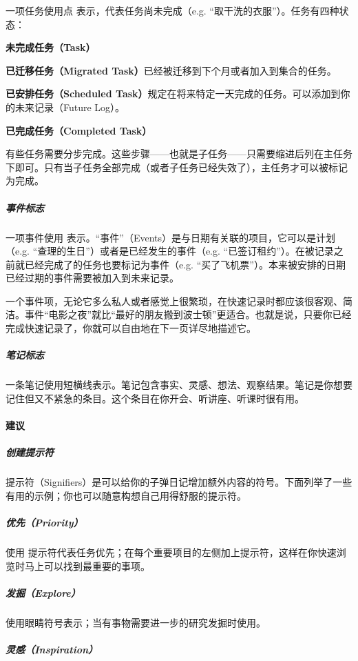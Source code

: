 \documentclass[a5paper]{article}
\begin{document}
一项任务使用点 \textbullet 表示，代表任务尚未完成（e.g. “取干洗的衣服”）。任务有四种状态：

\textbf{未完成任务（Task）}

\textbf{已迁移任务（Migrated Task）}已经被迁移到下个月或者加入到集合的任务。

\textbf{已安排任务（Scheduled Task）}规定在将来特定一天完成的任务。可以添加到你的未来记录（Future Log）。

\textbf{已完成任务（Completed Task）}

有些任务需要分步完成。这些步骤——也就是子任务——只需要缩进后列在主任务下即可。只有当子任务全部完成（或者子任务已经失效了），主任务才可以被标记为完成。

\clearpage

\subparagraph{事件标志}

一项事件使用 \textbigcircle 表示。“事件”（Events）是与日期有关联的项目，它可以是计划（e.g. “查理的生日”）或者是已经发生的事件（e.g. “已签订租约”）。在被记录之前就已经完成了的任务也要标记为事件（e.g. “买了飞机票”）。本来被安排的日期已经过期的事件需要被加入到未来记录。

一个事件项，无论它多么私人或者感觉上很繁琐，在快速记录时都应该很客观、简洁。事件“电影之夜”就比“最好的朋友搬到波士顿”更适合。也就是说，只要你已经完成快速记录了，你就可以自由地在下一页详尽地描述它。

\subparagraph{笔记标志}

一条笔记使用短横线\textendash 表示。笔记包含事实、灵感、想法、观察结果。笔记是你想要记住但又不紧急的条目。这个条目在你开会、听讲座、听课时很有用。

\clearpage

\paragraph{建议}

\subparagraph{创建提示符}

提示符（Signifiers）是可以给你的子弹日记增加额外内容的符号。下面列举了一些有用的示例；你也可以随意构想自己用得舒服的提示符。

\subparagraph{优先（Priority）}

使用 \textasteriskcentered 提示符代表任务优先；在每个重要项目的左侧加上提示符，这样在你快速浏览时马上可以找到最重要的事项。

\subparagraph{发掘（Explore）}

使用眼睛符号表示；当有事物需要进一步的研究发掘时使用。

\subparagraph{灵感（Inspiration）}
\end{document}
